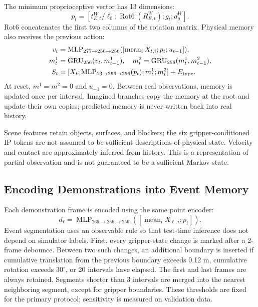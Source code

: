\documentclass[
  10pt,
]{article}
\begin{document}
The minimum proprioceptive vector has 13 dimensions:
\begin{equation}\label{eq:proprio}
p_t=[t_{E,t}^W/\ell_0;\operatorname{Rot6}(R_{E,t}^W);g_t;d_g^W].
\end{equation}
Rot6 concatenates the first two columns of the rotation matrix. Physical memory also receives the previous action:
\begin{equation}\label{eq:memory}
\begin{aligned}
v_t&=\operatorname{MLP}_{277\to256\to256}([\operatorname{mean}_iX_{t,i};p_t;u_{t-1}]),\\
m_t^1&=\operatorname{GRU}_{256}(v_t,m_{t-1}^1),\quad m_t^2=\operatorname{GRU}_{256}(m_t^1,m_{t-1}^2),\\
S_t&=[X_t;\operatorname{MLP}_{13\to256\to256}(p_t);m_t^1;m_t^2]+E_{\rm type}.
\end{aligned}
\end{equation}
At reset, \(m^1=m^2=0\) and \(u_{-1}=0\). Between real observations, memory is updated once per interval. Imagined branches copy the memory at the root and update their own copies; predicted memory is never written back into real history.

Scene features retain objects, surfaces, and blockers; the six gripper-conditioned IP tokens are not assumed to be sufficient descriptions of physical state. Velocity and contact are approximately inferred from history. This is a representation of partial observation and is not guaranteed to be a sufficient Markov state.

\hypertarget{muxe3-huxf3a-demonstration-thuxe0nh-event-memory}{%
\subsection{Encoding Demonstrations into Event Memory}\label{muxe3-huxf3a-demonstration-thuxe0nh-event-memory}}

Each demonstration frame is encoded using the same point encoder:
\begin{equation}\label{eq:demoframe}
d_\ell=\operatorname{MLP}_{269\to256\to256}([\operatorname{mean}_iX_{\ell,i};p_\ell]).
\end{equation}
Event segmentation uses an observable rule so that test-time inference does not depend on simulator labels. First, every gripper-state change is marked after a 2-frame debounce. Between two such changes, an additional boundary is inserted if cumulative translation from the previous boundary exceeds 0.12 m, cumulative rotation exceeds \(30^\circ\), or 20 intervals have elapsed. The first and last frames are always retained. Segments shorter than 3 intervals are merged into the nearest neighboring segment, except for gripper boundaries. These thresholds are fixed for the primary protocol; sensitivity is measured on validation data.
\end{document}
